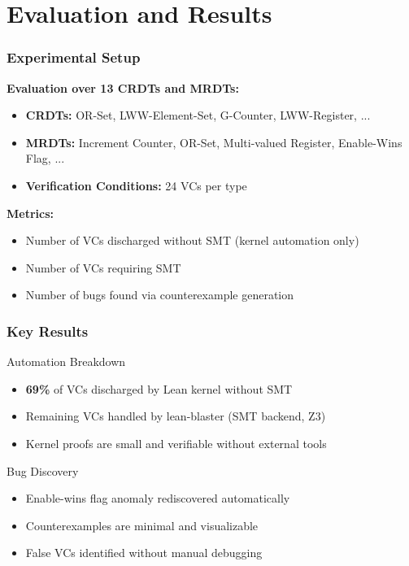 \documentclass[usepdftitle=false]{beamer}
\begin{document}
\section{Evaluation and Results}

\begin{frame}
  \frametitle{Experimental Setup}
  
  \textbf{Evaluation over 13 CRDTs and MRDTs:}
  
  \begin{itemize}
    \item \textbf{CRDTs:} OR-Set, LWW-Element-Set, G-Counter, LWW-Register, ...
    \item \textbf{MRDTs:} Increment Counter, OR-Set, Multi-valued Register, Enable-Wins Flag, ...
    \item \textbf{Verification Conditions:} 24 VCs per type
  \end{itemize}
  
  \vspace{0.3cm}
  \textbf{Metrics:}
  \begin{itemize}
    \item Number of VCs discharged without SMT (kernel automation only)
    \item Number of VCs requiring SMT
    \item Number of bugs found via counterexample generation
  \end{itemize}
\end{frame}

\begin{frame}
  \frametitle{Key Results}
  
  \begin{block}{Automation Breakdown}
    \begin{itemize}
      \item \textbf{69\%} of VCs discharged by Lean kernel without SMT
      \item Remaining VCs handled by lean-blaster (SMT backend, Z3)
      \item Kernel proofs are small and verifiable without external tools
    \end{itemize}
  \end{block}
  
  \vspace{0.3cm}
  \begin{block}{Bug Discovery}
    \begin{itemize}
      \item Enable-wins flag anomaly rediscovered automatically
      \item Counterexamples are minimal and visualizable
      \item False VCs identified without manual debugging
    \end{itemize}
  \end{block}
\end{frame}
\end{document}
